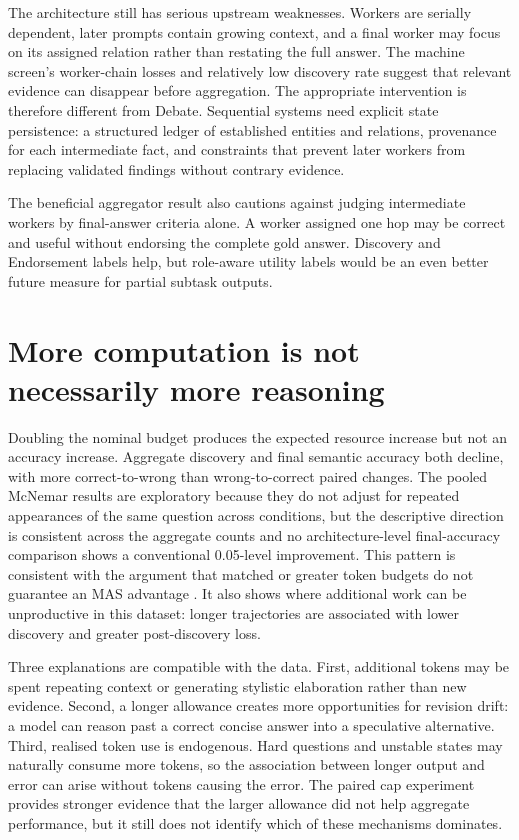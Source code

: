The architecture still has serious upstream weaknesses. Workers are serially dependent, later prompts contain growing context, and a final worker may focus on its assigned relation rather than restating the full answer. The machine screen's worker-chain losses and relatively low discovery rate suggest that relevant evidence can disappear before aggregation. The appropriate intervention is therefore different from Debate. Sequential systems need explicit state persistence: a structured ledger of established entities and relations, provenance for each intermediate fact, and constraints that prevent later workers from replacing validated findings without contrary evidence.

The beneficial aggregator result also cautions against judging intermediate workers by final-answer criteria alone. A worker assigned one hop may be correct and useful without endorsing the complete gold answer. Discovery and Endorsement labels help, but role-aware utility labels would be an even better future measure for partial subtask outputs.

\section{More computation is not necessarily more reasoning}

Doubling the nominal budget produces the expected resource increase but not an accuracy increase. Aggregate discovery and final semantic accuracy both decline, with more correct-to-wrong than wrong-to-correct paired changes. The pooled McNemar results are exploratory because they do not adjust for repeated appearances of the same question across conditions, but the descriptive direction is consistent across the aggregate counts and no architecture-level final-accuracy comparison shows a conventional 0.05-level improvement. This pattern is consistent with the argument that matched or greater token budgets do not guarantee an MAS advantage \citep{tran2026single}. It also shows where additional work can be unproductive in this dataset: longer trajectories are associated with lower discovery and greater post-discovery loss.

Three explanations are compatible with the data. First, additional tokens may be spent repeating context or generating stylistic elaboration rather than new evidence. Second, a longer allowance creates more opportunities for revision drift: a model can reason past a correct concise answer into a speculative alternative. Third, realised token use is endogenous. Hard questions and unstable states may naturally consume more tokens, so the association between longer output and error can arise without tokens causing the error. The paired cap experiment provides stronger evidence that the larger allowance did not help aggregate performance, but it still does not identify which of these mechanisms dominates.

